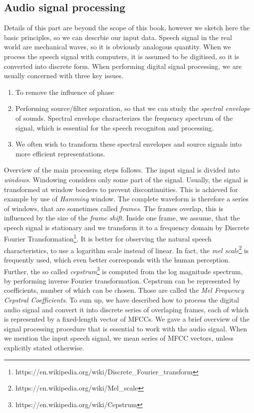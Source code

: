 \subsection{Audio signal processing\cite{taylor2009text}}
\label{ASP-desc}
Details of this part are beyond the scope of this book, however we sketch here the basic principles, so we can descrbie our input data.
Speech signal in the real world are mechanical waves, so it is obviously analogous quantity.
When we process the speech signal with computers, it is assumed to be digitised, so it is converted into discrete form.
When performing digital signal processing, we are usually concerned with three key issues.
\begin{enumerate}
\item To remove the influence of phase
\item Performing source/filter separation, so that we can study the \textit{spectral envelope} of sounds.
Spectral envelope characterizes the frequency spectrum of the signal, which is essential for the speech recogniton and processing.
\item We often wish to transform these spectral envelopes and source signals into more efficient representations.
\end{enumerate}
Overview of the main processing steps follows.
The input signal is divided into \textit{windows}.
Windowing considers only some part of the signal.
Usually, the signal is transformed at window borders to prevent discontinuities.
This is achieved for example by use of \textit{Hamming} window.
The complete waveform is therefore a series of windows, that are sometimes called \textit{frames}.
The frames overlap, this is influenced by the size of the \textit{frame shift}.
Inside one frame, we assume, that the speech signal is stationary and we transform it to a frequency domain by Discrete Fourier Transformation\footnote{https://en.wikipedia.org/wiki/Discrete\_Fourier\_transform}.
It is better for observing the natural speech characteristics, to use a logarithm scale instead of linear.
In fact, the \textit{mel scale}\footnote{https://en.wikipedia.org/wiki/Mel\_scale} is frequently used, which even better corresponds with the human perception.
Further, the so called \textit{cepstrum}\footnote{https://en.wikipedia.org/wiki/Cepstrum} is computed from the log magnitude spectrum, by performing inverse Fourier transformation.
Cepstrum can be represented by coefficients, number of which can be chosen.
Those are called the \textit{Mel Frequency Cepstral Coefficients}.
To sum up, we have described how to process the digital audio signal and convert it into discrete series of overlaping frames, each of which is represented by a fixed-length vector of MFCCs.
\linebreak\linebreak
We gave a brief overview of the signal processing procedure that is essential to work with the audio signal.
When we mention the input speech signal, we mean series of MFCC vectors, unless explicitly stated otherwise.
